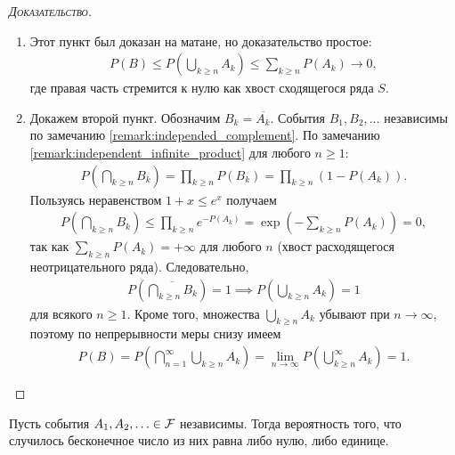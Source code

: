 \documentclass[../main.tex]{subfiles}
\begin{document}
\begin{proof}[\normalfont\textsc{Доказательство}]\
 \begin{enumerate}
  \item Этот пункт был доказан на матане, но доказательство простое:
   \begin{align*}
    P(B) \leqslant P \left( \bigcup_{k \geqslant n} A_k \right) \leqslant \sum_{k \geqslant n} P(A_k) \to 0,
   \end{align*} где правая часть стремится к нулю как хвост сходящегося ряда $ S $.

  \item Докажем второй пункт. Обозначим $B_k = \overline {A_k}$. События $B_1, B_2, \ldots$ независимы по замечанию \ref{remark:independed_complement}. По замечанию \ref{remark:independent_infinite_product} для любого $ n \geqslant 1$:
   \begin{align*}
    P \left( \bigcap_{k \geqslant n} B_k \right) = \prod_{k \geqslant n} P(B_k) = \prod_{k \geqslant n} (1 - P(A_k)).
   \end{align*} Пользуясь неравенством $ 1 + x \leqslant e^{x} $ получаем 
   \begin{align*}
    P \left( \bigcap_{k \geqslant n} B_k \right) \leqslant \prod_{k \geqslant n} e^{-P(A_k)} = \exp \left(-\sum_{k \geqslant n} P(A_k)\right) = 0,
   \end{align*} так как $ \sum_{k \geqslant n} P(A_k) = +\infty $ для любого $ n $ (хвост расходящегося неотрицательного ряда). Следовательно,
   \begin{align*}
    P \left( \overline { \bigcap_{k \geqslant n} B_k } \right) = 1 \implies P \left( \bigcup_{k \geqslant n} A_k \right) = 1
   \end{align*} для всякого $ n \geqslant 1 $. Кроме того, множества $\bigcup_{k \geqslant n} A_k$ убывают при $ n \to \infty $, поэтому по непрерывности меры снизу имеем
   \begin{align*}
    P(B) = P \left( \bigcap_{n=1}^{\infty} \bigcup_{k \geqslant n} A_k \right) = \lim_{n \to \infty} P \left( \bigcup_{k \geqslant n}^{\infty} A_k \right) = 1.
   \end{align*}
 \end{enumerate}
\end{proof}
\begin{crly*}
 Пусть события $A_1, A_2, \ldots \in \mathcal F$ независимы. Тогда вероятность того, что случилось бесконечное число из них равна либо нулю, либо единице. 
\end{crly*}
\end{document}

